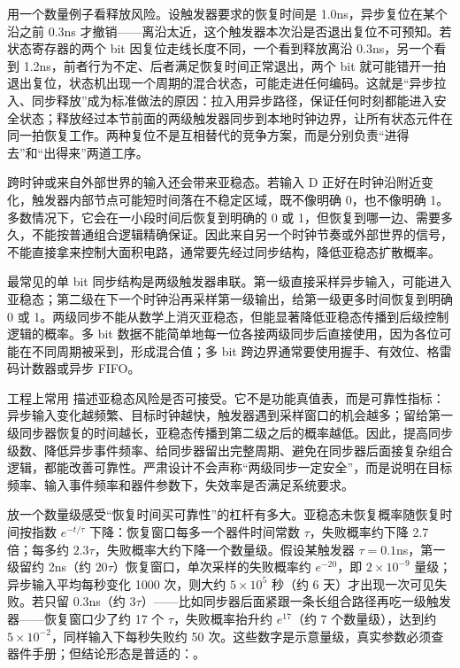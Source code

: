 用一个数量例子看释放风险。设触发器要求的恢复时间是 1.0ns，异步复位在某个沿之前 0.3ns 才撤销——离沿太近，这个触发器本次沿是否退出复位不可预知。若状态寄存器的两个 bit 因复位走线长度不同，一个看到释放离沿 0.3ns，另一个看到 1.2ns，前者行为不定、后者满足恢复时间正常退出，两个 bit 就可能错开一拍退出复位，状态机出现一个周期的混合状态，可能走进任何编码。这就是“异步拉入、同步释放”成为标准做法的原因：拉入用异步路径，保证任何时刻都能进入安全状态；释放经过本节前面的两级触发器同步到本地时钟边界，让所有状态元件在同一拍恢复工作。两种复位不是互相替代的竞争方案，而是分别负责“进得去”和“出得来”两道工序。

跨时钟或来自外部世界的输入还会带来亚稳态。若输入 D 正好在时钟沿附近变化，触发器内部节点可能短时间落在不稳定区域，既不像明确 0，也不像明确 1。多数情况下，它会在一小段时间后恢复到明确的 0 或 1，但恢复到哪一边、需要多久，不能按普通组合逻辑精确保证。因此来自另一个时钟节奏或外部世界的信号，不能直接拿来控制大面积电路，通常要先经过同步结构，降低亚稳态扩散概率。

最常见的单 bit 同步结构是两级触发器串联。第一级直接采样异步输入，可能进入亚稳态；第二级在下一个时钟沿再采样第一级输出，给第一级更多时间恢复到明确 0 或 1。两级同步不能从数学上消灭亚稳态，但能显著降低亚稳态传播到后级控制逻辑的概率。多 bit 数据不能简单地每一位各接两级同步后直接使用，因为各位可能在不同周期被采到，形成混合值；多 bit 跨边界通常要使用握手、有效位、格雷码计数器或异步 FIFO。

工程上常用  描述亚稳态风险是否可接受。它不是功能真值表，而是可靠性指标：异步输入变化越频繁、目标时钟越快，触发器遇到采样窗口的机会越多；留给第一级同步器恢复的时间越长，亚稳态传播到第二级之后的概率越低。因此，提高同步级数、降低异步事件频率、给同步器留出完整周期、避免在同步器后面接复杂组合逻辑，都能改善可靠性。严肃设计不会声称“两级同步一定安全”，而是说明在目标频率、输入事件频率和器件参数下，失效率是否满足系统要求。

放一个数量级感受“恢复时间买可靠性”的杠杆有多大。亚稳态未恢复概率随恢复时间按指数 $e^{-t/\tau}$ 下降：恢复窗口每多一个器件时间常数 $\tau$，失败概率约下降 2.7 倍；每多约 $2.3\tau$，失败概率大约下降一个数量级。假设某触发器 $\tau=0.1$ns，第一级留约 2ns（约 $20\tau$）恢复窗口，单次采样的失败概率约 $e^{-20}$，即 $2\times10^{-9}$ 量级；异步输入平均每秒变化 1000 次，则大约 $5\times10^5$ 秒（约 6 天）才出现一次可见失败。若只留 0.3ns（约 $3\tau$）——比如同步器后面紧跟一条长组合路径再吃一级触发器——恢复窗口少了约 17 个 $\tau$，失败概率抬升约 $e^{17}$（约 7 个数量级），达到约 $5\times10^{-2}$，同样输入下每秒失败约 50 次。这些数字是示意量级，真实参数必须查器件手册；但结论形态是普适的：。

